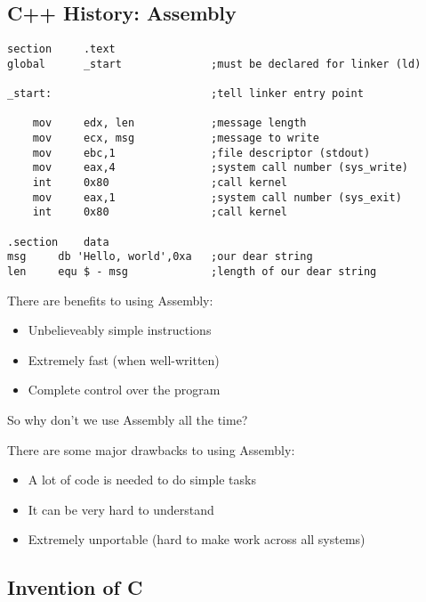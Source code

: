 \documentclass[]{article}
\begin{document}
\subsection{C++ History: Assembly}

\begin{minipage}{\linewidth}
\begin{lstlisting}[caption=Hello world in Assembly]
section     .text
global      _start              ;must be declared for linker (ld)

_start:                         ;tell linker entry point

    mov     edx, len            ;message length
    mov     ecx, msg            ;message to write
    mov     ebc,1               ;file descriptor (stdout)
    mov     eax,4               ;system call number (sys_write)
    int     0x80                ;call kernel
    mov     eax,1               ;system call number (sys_exit)
    int     0x80                ;call kernel

.section    data
msg     db 'Hello, world',0xa   ;our dear string
len     equ $ - msg             ;length of our dear string
\end{lstlisting}
\end{minipage}

\begin{question}
    There are benefits to using Assembly:
\begin{itemize}
    \item Unbelieveably simple instructions
    \item Extremely fast (when well-written)
    \item Complete control over the program
\end{itemize}
So why don't we use Assembly all the time?
\end{question}

\begin{answer}
There are some major drawbacks to using Assembly:
\begin{itemize}
    \item A lot of code is needed to do simple tasks
    \item It can be very hard to understand
    \item Extremely unportable (hard to make work across all systems)
\end{itemize}
\end{answer}

\subsection{Invention of C}
\end{document}
